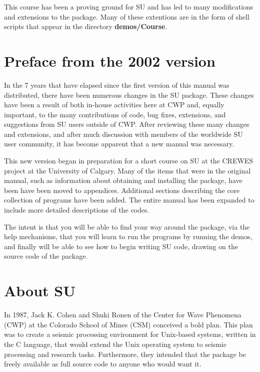 This course has been a proving ground for SU and has led to many
modifications and extensions to the package. Many of these
extentions are in the form of shell scripts that appear in
the directory {\bf demos/Course\/}.


\chapter*{Preface from the 2002 version}
In the 7 years that have elapsed since the first version of
this manual was distributed, there have been numerous changes
in the SU package.
These changes have been a result of
both in-house activities here at CWP and, equally important,
to the many contributions of code, bug fixes, extensions,
and suggestions from SU users outside of CWP.
After reviewing these many changes and extensions, and after
much discussion with members of the worldwide SU user community,
it has become apparent that a new manual was necessary.

This new version began in preparation for a short course on
SU at the CREWES project at the University of Calgary.
Many of the items that were in the original manual,
such as information about obtaining and installing the package,
have been have been moved to appendices.
Additional sections describing the core collection of
programs have been added.
The entire manual has been expanded to include more detailed
descriptions of the codes.

The intent is that you will be able to find your way around
the package, via the help mechanisms, that you will learn to
run the programs by running the demos, and finally will be
able to see how to begin writing SU code, drawing on the
source code of the package.

\chapter{About SU}

In 1987, Jack K. Cohen and Shuki Ronen of the Center for Wave Phenomena
(CWP) at the Colorado School of Mines (CSM) conceived a bold plan. This
plan was to create a seismic processing environment for Unix-based systems,
written in the C language, that would extend the Unix operating system to
seismic processing and research tasks. Furthermore, they intended that the
package be freely available as full source code to anyone who would want
it. 

